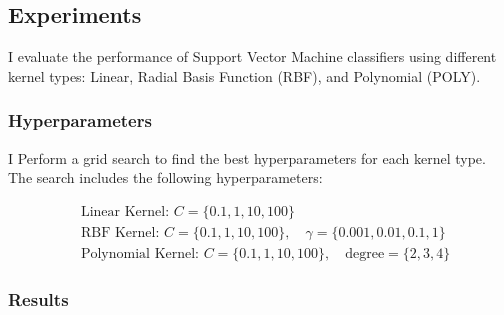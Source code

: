 \documentclass{homework}
\begin{document}
\subsection{Experiments}

I evaluate the performance of Support Vector Machine classifiers using different kernel types: Linear, Radial Basis Function (RBF), and Polynomial (POLY).

\subsubsection{Hyperparameters}

I Perform a grid search to find the best hyperparameters for each kernel type. The search includes the following hyperparameters:

\begin{align*}
&\text{Linear Kernel: } C = \{0.1, 1, 10, 100\} \\
&\text{RBF Kernel: } C = \{0.1, 1, 10, 100\}, \quad \gamma = \{0.001, 0.01, 0.1, 1\} \\
&\text{Polynomial Kernel: } C = \{0.1, 1, 10, 100\}, \quad \text{degree} = \{2, 3, 4\}
\end{align*}

\subsubsection{Results}






\end{document}
